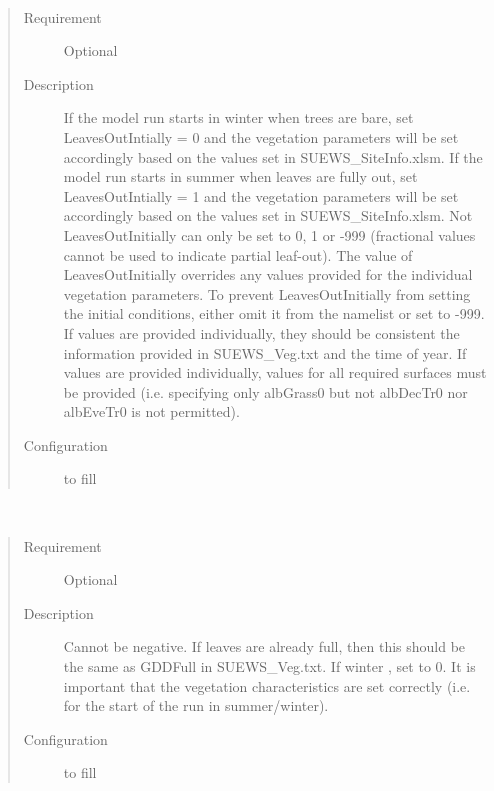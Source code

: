 \documentclass[letterpaper,10pt,english]{sphinxmanual}
\begin{document}
\begin{fulllineitems}
\label{\detokenize{input_files/Initial_Conditions/Vegetation_parameters:cmdoption-arg-leavesoutintially}}~\begin{quote}\begin{description}
\item[{Requirement}] \leavevmode
Optional

\item[{Description}] \leavevmode
If the model run starts in winter when trees are bare, set LeavesOutIntially = 0 and the vegetation parameters will be set accordingly based on the values set in SUEWS\_SiteInfo.xlsm. If the model run starts in summer when leaves are fully out, set LeavesOutIntially = 1 and the vegetation parameters will be set accordingly based on the values set in SUEWS\_SiteInfo.xlsm. Not LeavesOutInitially can only be set to 0, 1 or -999 (fractional values cannot be used to indicate partial leaf-out). The value of LeavesOutInitially overrides any values provided for the individual vegetation parameters. To prevent LeavesOutInitially from setting the initial conditions, either omit it from the namelist or set to -999. If values are provided individually, they should be consistent the information provided in SUEWS\_Veg.txt and the time of year. If values are provided individually, values for all required surfaces must be provided (i.e. specifying only albGrass0 but not albDecTr0 nor albEveTr0 is not permitted).

\item[{Configuration}] \leavevmode
to fill

\end{description}\end{quote}

\end{fulllineitems}


\begin{fulllineitems}
\label{\detokenize{input_files/Initial_Conditions/Vegetation_parameters:cmdoption-arg-gdd-1-0}}~\begin{quote}\begin{description}
\item[{Requirement}] \leavevmode
Optional

\item[{Description}] \leavevmode
Cannot be negative. If leaves are already full, then this should be the same as GDDFull in SUEWS\_Veg.txt. If winter , set to 0. It is important that the vegetation characteristics are set correctly (i.e. for the start of the run in summer/winter).

\item[{Configuration}] \leavevmode
to fill

\end{description}\end{quote}

\end{fulllineitems}
\end{document}
